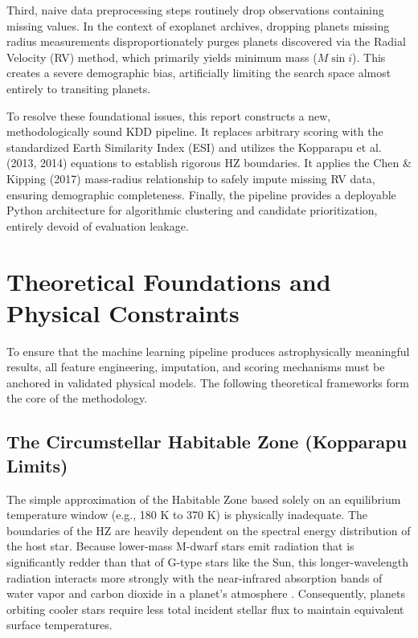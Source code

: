 Third, naive data preprocessing steps routinely drop observations containing missing values. In the context of exoplanet archives, dropping planets missing radius measurements disproportionately purges planets discovered via the Radial Velocity (RV) method, which primarily yields minimum mass ($M \sin i$). This creates a severe demographic bias, artificially limiting the search space almost entirely to transiting planets.

To resolve these foundational issues, this report constructs a new, methodologically sound KDD pipeline. It replaces arbitrary scoring with the standardized Earth Similarity Index (ESI) \cite{EarthSimilarityIndex} and utilizes the Kopparapu et al. (2013, 2014) equations to establish rigorous HZ boundaries. It applies the Chen \& Kipping (2017) mass-radius relationship to safely impute missing RV data, ensuring demographic completeness. Finally, the pipeline provides a deployable Python architecture for algorithmic clustering and candidate prioritization, entirely devoid of evaluation leakage.

\section{Theoretical Foundations and Physical Constraints}
To ensure that the machine learning pipeline produces astrophysically meaningful results, all feature engineering, imputation, and scoring mechanisms must be anchored in validated physical models. The following theoretical frameworks form the core of the methodology.

\subsection{The Circumstellar Habitable Zone (Kopparapu Limits)}
The simple approximation of the Habitable Zone based solely on an equilibrium temperature window (e.g., 180 K to 370 K) is physically inadequate. The boundaries of the HZ are heavily dependent on the spectral energy distribution of the host star. Because lower-mass M-dwarf stars emit radiation that is significantly redder than that of G-type stars like the Sun, this longer-wavelength radiation interacts more strongly with the near-infrared absorption bands of water vapor and carbon dioxide in a planet's atmosphere \cite{InnerEdgeHZ}. Consequently, planets orbiting cooler stars require less total incident stellar flux to maintain equivalent surface temperatures.

